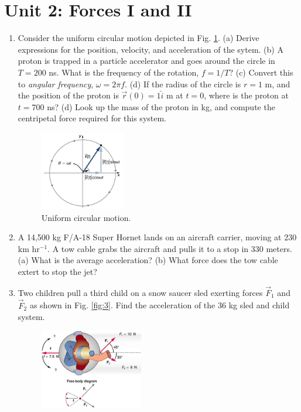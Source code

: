 \documentclass[10pt]{article}
\begin{document}
\section{Unit 2: Forces I and II}

\begin{enumerate}
\item Consider the uniform circular motion depicted in Fig. \ref{fig:2}. (a) Derive expressions for the position, velocity, and acceleration of the sytem. (b) A proton is trapped in a particle accelerator and goes around the circle in $T = 200$ ns.  What is the frequency of the rotation, $f = 1/T$? (c) Convert this to \textit{angular frequency}, $\omega = 2\pi f$. (d) If the radius of the circle is $r=1$ m, and the position of the proton is $\vec{r}(0) = 1\hat{i}$ m at $t=0$, where is the proton at $t=700$ ns? (d) Look up the mass of the proton in kg, and compute the centripetal force required for this system.
\begin{figure}
\centering
\includegraphics[width=0.35\textwidth]{circ_motion.png}
\caption{\label{fig:2} Uniform circular motion.}
\end{figure} \vspace{3.5cm}
\item A 14,500 kg F/A-18 Super Hornet lands on an aircraft carrier, moving at 230 km hr$^{-1}$. A tow cable grabs the aircraft and pulls it to a stop in 330 meters. (a) What is the average acceleration? (b) What force does the tow cable extert to stop the jet? \\ \vspace{2.5cm}
\item Two children pull a third child on a snow saucer sled exerting forces $\vec{F}_1$ and $\vec{F}_2$ as shown in Fig. \ref{fig:3}. Find the acceleration of the 36 kg sled and child system.
\begin{figure}
\centering
\includegraphics[width=0.425\textwidth]{sled.jpeg}

\end{figure}
\end{enumerate}
\end{document}
